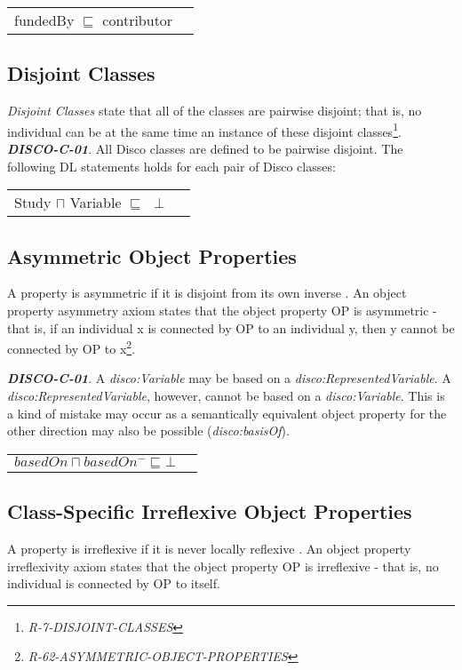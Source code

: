 \documentclass{elsart3p}    %
\newenvironment{DL}{
  \vspace{0cm}
  \begin{tabular}{l l}

}{
  \end{tabular}
}
\begin{document}
\begin{DL}
fundedBy $\sqsubseteq$ contributor 
\end{DL}

\subsection{Disjoint Classes}

{\em Disjoint Classes} state that all of the classes are pairwise disjoint; 
that is, no individual can be at the same time an instance of these disjoint classes\footnote{{\em R-7-DISJOINT-CLASSES}}.
\textbf{{\em DISCO-C-01}}. All Disco classes are defined to be pairwise disjoint.
The following DL statements holds for each pair of Disco classes:

\begin{DL}
Study $\sqcap$ Variable $\sqsubseteq$ $\perp$\\
\end{DL}

\subsection{Asymmetric Object Properties}

A property is asymmetric if it is disjoint from its own inverse \cite{Kroetzsch2012}.
An object property asymmetry axiom states that the object property OP is asymmetric - that is, if an individual x is connected by OP to an individual y, then y cannot be connected by OP to x\footnote{{\em R-62-ASYMMETRIC-OBJECT-PROPERTIES}}. 

\textbf{{\em DISCO-C-01}}. 
A {\em disco:Variable} may be based on a {\em disco:RepresentedVariable}.
A {\em disco:RepresentedVariable}, however, cannot be based on a {\em disco:Variable}.
This is a kind of mistake may occur as a semantically equivalent object property for the other direction may also be possible ({\em disco:basisOf}).

\begin{DL}
$basedOn \sqcap basedOn^{-} \sqsubseteq \bot$ 
\end{DL}

\subsection{Class-Specific Irreflexive Object Properties}

A property is irreflexive if it is never locally reflexive \cite{Kroetzsch2012}.
An object property irreflexivity axiom states that the object property OP is irreflexive - that is, no individual is connected by OP to itself. 
\end{document}
